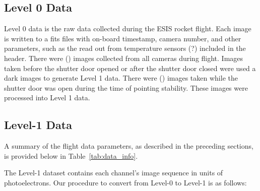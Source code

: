     \subsection{Level 0 Data}
	    Level 0 data is the raw data collected during the ESIS rocket flight.  
	    Each image is written to a fits files with on-board timestamp, camera number, and other parameters, such as the read out from temperature sensors (?) included in the header.  There were () images collected from all cameras during flight.  
	    Images taken before the shutter door opened or after the shutter door closed were used a dark images to generate Level 1 data.  
	    There were () images taken while the shutter door was open during the time of pointing stability.  
	    These images were processed into Level 1 data.  

    
    \subsection{Level-1 Data}
	    
  
    
    	
    	
    	A summary of the flight data parameters, as described in the preceding sections, is provided below in Table~\ref{tab:data_info}. 
    	
    	The Level-1 dataset contains each channel's image sequence in units of photoelectrons.
    	Our procedure to convert from Level-0 to Level-1 is as follows:
    	

